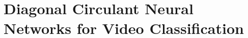 \chapter{Diagonal Circulant Neural Networks for Video Classification}
\label{chapter:diagonal_circulant_neural_networks_for_video_classification}
\localtoc


%
%
%
